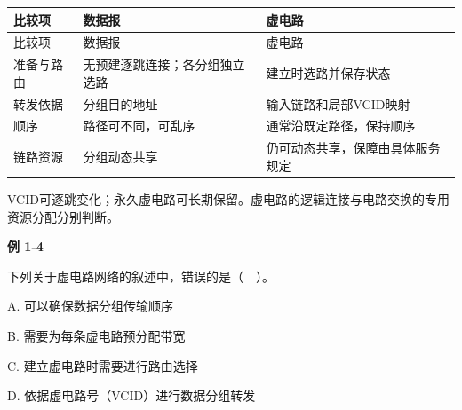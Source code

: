 \par\smallskip
{\fontsize{9.3}{12}\selectfont\setlength{\tabcolsep}{2.5pt}\setlength{\LTleft}{0pt}\setlength{\LTright}{0pt}
\begin{longtable}{@{}>{\raggedright\arraybackslash}p{}>{\raggedright\arraybackslash}p{}>{\raggedright\arraybackslash}p{}@{}}
\toprule
比较项 & 数据报 & 虚电路 \\

\midrule\endfirsthead\toprule
比较项 & 数据报 & 虚电路 \\

\midrule\endhead\bottomrule\endfoot
准备与路由 & 无预建逐跳连接；各分组独立选路 & 建立时选路并保存状态 \\

转发依据 & 分组目的地址 & 输入链路和局部VCID映射 \\

顺序 & 路径可不同，可乱序 & 通常沿既定路径，保持顺序 \\

链路资源 & 分组动态共享 & 仍可动态共享，保障由具体服务规定 \\

\end{longtable}}
\par\smallskip

VCID可逐跳变化；永久虚电路可长期保留。虚电路的逻辑连接与电路交换的专用资源分配分别判断。

\par\medskip{}\noindent\hypertarget{CN01-E04}{}\label{CN01-E04}\textbf{例 1-4}\par\nobreak\smallskip

下列关于虚电路网络的叙述中，错误的是（　）。

A. 可以确保数据分组传输顺序

B. 需要为每条虚电路预分配带宽

C. 建立虚电路时需要进行路由选择

D. 依据虚电路号（VCID）进行数据分组转发
